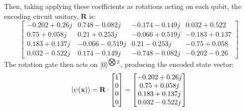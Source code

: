 Then, taking applying these coefficients as rotations acting on each qubit, the encoding circuit unitary, $\textbf{R}$ is:
\begin{equation}
    \begin{bmatrix}
    -0.202+0.26j &  0.748-0.082j & -0.174-0.149j & 0.032+0.522 \\
    0.75 +0.058j &  0.21 +0.253j & -0.066+0.519j & -0.183+0.137 \\
    0.183+0.137j & -0.066-0.519j &  0.21 -0.253j & -0.75 +0.058 \\
    0.032-0.522j &  0.174-0.149j & -0.748-0.082j & -0.202-0.26 
    \end{bmatrix}
\end{equation}
% 
The rotation gate then acts on $\left\vert{0}\right\rangle^{\bigotimes 2}$, producing the encoded state vector:
\begin{equation}
    \left\vert{\psi (\textbf{x})}\right\rangle
    =
    \textbf{R} \cdot
    \begin{bmatrix}
        1 \\ 0 \\ 0 \\ 0
    \end{bmatrix}
    =
    \begin{bmatrix}
        -0.202+0.26j \\
        0.75 +0.058j \\
        0.183+0.137j \\
        0.032-0.522j
    \end{bmatrix}
\end{equation}


